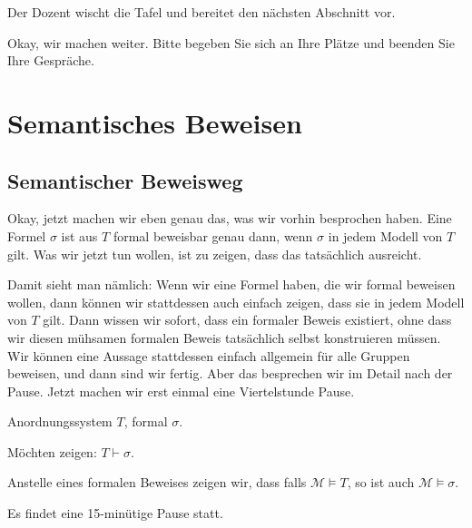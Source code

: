 
\begin{meta-note}[Tafelreinigung]
Der Dozent wischt die Tafel und bereitet den nächsten Abschnitt vor.
\end{meta-note}

\begin{spoken-clean}[00:35:10 - 00:37:10]
Okay, wir machen weiter. Bitte begeben Sie sich an Ihre Plätze und beenden Sie Ihre Gespräche.
\end{spoken-clean}

\section{Semantisches Beweisen}

\subsection{Semantischer Beweisweg}
\begin{spoken-clean}[00:37:10 - 00:40:05]
Okay, jetzt machen wir eben genau das, was wir vorhin besprochen haben. Eine Formel $\sigma$ ist aus $T$ formal beweisbar genau dann, wenn $\sigma$ in jedem Modell von $T$ gilt. Was wir jetzt tun wollen, ist zu zeigen, dass das tatsächlich ausreicht.

Damit sieht man nämlich: Wenn wir eine Formel haben, die wir formal beweisen wollen, dann können wir stattdessen auch einfach zeigen, dass sie in jedem Modell von $T$ gilt. Dann wissen wir sofort, dass ein formaler Beweis existiert, ohne dass wir diesen mühsamen formalen Beweis tatsächlich selbst konstruieren müssen. Wir können eine Aussage stattdessen einfach allgemein für alle Gruppen beweisen, und dann sind wir fertig. Aber das besprechen wir im Detail nach der Pause. Jetzt machen wir erst einmal eine Viertelstunde Pause.
\end{spoken-clean}

\begin{math-stroke}
Anordnungssystem $T$, formal $\sigma$.

Möchten zeigen: $T \vdash \sigma$.

Anstelle eines formalen Beweises zeigen wir, dass falls $\mathcal{M} \models T$, so ist auch $\mathcal{M} \models \sigma$.
\end{math-stroke}

\begin{lecture-break}[Pause]
Es findet eine 15-minütige Pause statt.
\end{lecture-break}

